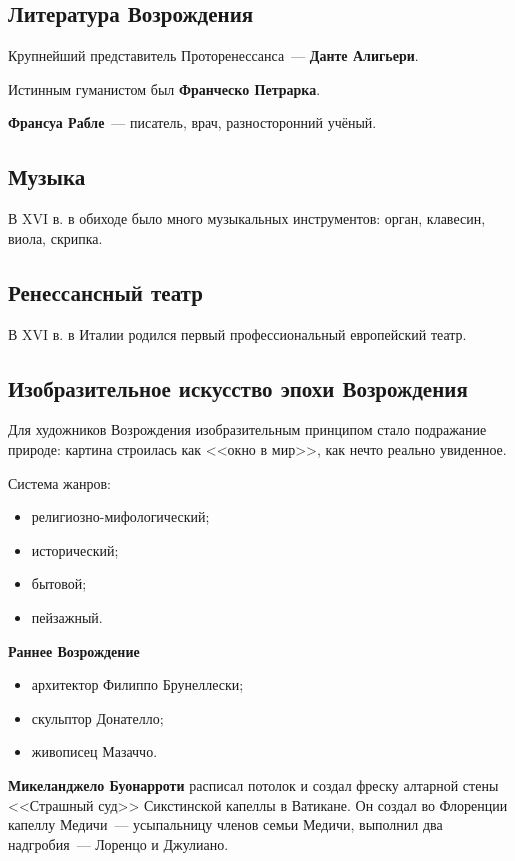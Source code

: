\documentclass[a4paper, 12pt]{article}
\begin{document}
\subsection{Литература Возрождения}
Крупнейший представитель Проторенессанса~--- \textbf{Данте Алигьери}.

Истинным гуманистом был \textbf{Франческо Петрарка}.

\textbf{Франсуа Рабле}~--- писатель, врач, разносторонний учёный.

\subsection{Музыка}
В XVI в. в обиходе было много музыкальных инструментов: орган, клавесин,
виола, скрипка.

\subsection{Ренессансный театр}
В XVI в. в Италии родился первый профессиональный европейский театр.

\subsection{Изобразительное искусство эпохи Возрождения}
Для художников Возрождения изобразительным принципом стало подражание
природе: картина строилась как <<окно в мир>>, как нечто реально увиденное.

Система жанров:
\begin{itemize}[noitemsep]
  \item религиозно-мифологический;
  \item исторический;
  \item бытовой;
  \item пейзажный.
\end{itemize}

\begin{center}
\textbf{Раннее Возрождение}
\end{center}
\begin{itemize}[noitemsep]
  \item архитектор Филиппо Брунеллески;
  \item скульптор Донателло;
  \item живописец Мазаччо.
\end{itemize}

\textbf{Микеланджело Буонарроти} расписал потолок и создал фреску алтарной
стены <<Страшный суд>> Сикстинской капеллы в Ватикане. Он создал во
Флоренции капеллу Медичи~--- усыпальницу членов семьи Медичи, выполнил два
надгробия~--- Лоренцо и Джулиано.
\end{document}
